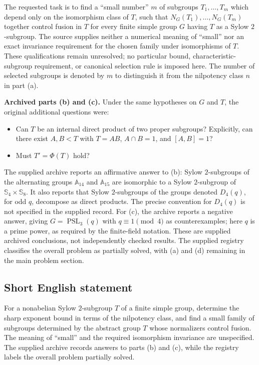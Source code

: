 \documentclass[11pt]{article}
\begin{document}
The requested task is to find a ``small number'' \(m\) of subgroups \(T_1,\ldots,T_m\) which depend only on the isomorphism class of \(T\), such that \(N_G(T_1),\ldots,N_G(T_m)\) together control fusion in \(T\) for every finite simple group \(G\) having \(T\) as a Sylow \(2\)-subgroup. The source supplies neither a numerical meaning of ``small'' nor an exact invariance requirement for the chosen family under isomorphisms of \(T\). These qualifications remain unresolved; no particular bound, characteristic-subgroup requirement, or canonical selection rule is imposed here. The number of selected subgroups is denoted by \(m\) to distinguish it from the nilpotency class \(n\) in part (a).

\textbf{Archived parts (b) and (c).} Under the same hypotheses on \(G\) and \(T\), the original additional questions were:
\begin{itemize}
\item[(b)] Can \(T\) be an internal direct product of two proper subgroups? Explicitly, can there exist \(A,B<T\) with \(T=AB\), \(A\cap B=1\), and \([A,B]=1\)?
\item[(c)] Must \(T'=\Phi(T)\) hold?
\end{itemize}
The supplied archive reports an affirmative answer to (b): Sylow \(2\)-subgroups of the alternating groups \(\mathbb{A}_{14}\) and \(\mathbb{A}_{15}\) are isomorphic to a Sylow \(2\)-subgroup of \(\mathbb{S}_4\times\mathbb{S}_8\). It also reports that Sylow \(2\)-subgroups of the groups denoted \(D_4(q)\), for odd \(q\), decompose as direct products. The precise convention for \(D_4(q)\) is not specified in the supplied record. For (c), the archive reports a negative answer, giving \(G=\operatorname{PSL}_3(q)\) with \(q\equiv 1\pmod 4\) as counterexamples; here \(q\) is a prime power, as required by the finite-field notation. These are supplied archived conclusions, not independently checked results. The supplied registry classifies the overall problem as partially solved, with (a) and (d) remaining in the main problem section.
\subsection{Short English statement}
For a nonabelian Sylow \(2\)-subgroup \(T\) of a finite simple group, determine the sharp exponent bound in terms of the nilpotency class, and find a small family of subgroups determined by the abstract group \(T\) whose normalizers control fusion. The meaning of ``small'' and the required isomorphism invariance are unspecified. The supplied archive records answers to parts (b) and (c), while the registry labels the overall problem partially solved.
\end{document}
